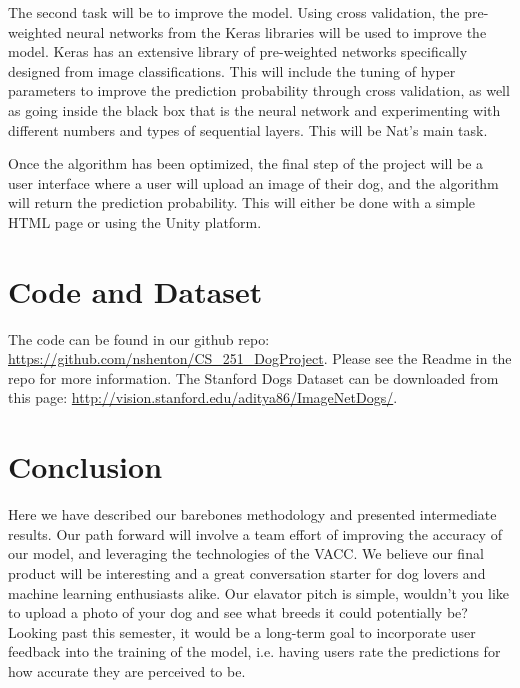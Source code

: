 \documentclass[12pt]{article}
\begin{document}
The second task will be to improve the model.  Using cross validation, the pre-weighted neural networks from the Keras libraries will be used to improve the model. Keras has an extensive library of pre-weighted networks specifically designed from image classifications. This will include the tuning of hyper parameters to improve the prediction probability through cross validation, as well as going inside the black box that is the neural network and experimenting with different numbers and types of sequential layers.  This will be Nat's main task.  

Once the algorithm has been optimized, the final step of the project will be a user interface where a user will upload an image of their dog, and the algorithm will return the prediction probability.  This will either be done with a simple HTML page or using the Unity platform. 

\section{Code and Dataset}

The code can be found in our github repo: \url{https://github.com/nshenton/CS_251_DogProject}.  Please see the Readme in the repo for more information.  The Stanford Dogs Dataset can be downloaded from this page: \url{http://vision.stanford.edu/aditya86/ImageNetDogs/}.

\section{Conclusion}

Here we have described our barebones methodology and presented intermediate results. Our path forward will involve a team effort of improving the accuracy of our model, and leveraging the technologies of the VACC. We believe our final product will be interesting and a great conversation starter for dog lovers and machine learning enthusiasts alike. Our elavator pitch is simple, wouldn't you like to upload a photo of your dog and see what breeds it could potentially be? Looking past this semester, it would be a long-term goal to incorporate user feedback into the training of the model, i.e. having users rate the predictions for how accurate they are perceived to be. 

{}

\end{document}
